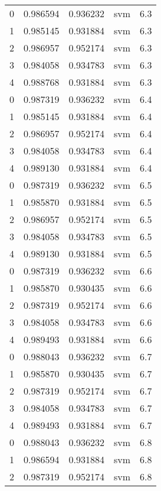 \begin{tabular}{rrrlr}
     0 & 0.986594 & 0.936232 &      svm &        6.3 \\
     1 & 0.985145 & 0.931884 &      svm &        6.3 \\
     2 & 0.986957 & 0.952174 &      svm &        6.3 \\
     3 & 0.984058 & 0.934783 &      svm &        6.3 \\
     4 & 0.988768 & 0.931884 &      svm &        6.3 \\
     0 & 0.987319 & 0.936232 &      svm &        6.4 \\
     1 & 0.985145 & 0.931884 &      svm &        6.4 \\
     2 & 0.986957 & 0.952174 &      svm &        6.4 \\
     3 & 0.984058 & 0.934783 &      svm &        6.4 \\
     4 & 0.989130 & 0.931884 &      svm &        6.4 \\
     0 & 0.987319 & 0.936232 &      svm &        6.5 \\
     1 & 0.985870 & 0.931884 &      svm &        6.5 \\
     2 & 0.986957 & 0.952174 &      svm &        6.5 \\
     3 & 0.984058 & 0.934783 &      svm &        6.5 \\
     4 & 0.989130 & 0.931884 &      svm &        6.5 \\
     0 & 0.987319 & 0.936232 &      svm &        6.6 \\
     1 & 0.985870 & 0.930435 &      svm &        6.6 \\
     2 & 0.987319 & 0.952174 &      svm &        6.6 \\
     3 & 0.984058 & 0.934783 &      svm &        6.6 \\
     4 & 0.989493 & 0.931884 &      svm &        6.6 \\
     0 & 0.988043 & 0.936232 &      svm &        6.7 \\
     1 & 0.985870 & 0.930435 &      svm &        6.7 \\
     2 & 0.987319 & 0.952174 &      svm &        6.7 \\
     3 & 0.984058 & 0.934783 &      svm &        6.7 \\
     4 & 0.989493 & 0.931884 &      svm &        6.7 \\
     0 & 0.988043 & 0.936232 &      svm &        6.8 \\
     1 & 0.986594 & 0.931884 &      svm &        6.8 \\
     2 & 0.987319 & 0.952174 &      svm &        6.8 \\

\end{tabular}
